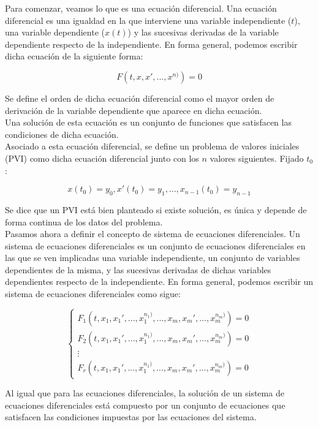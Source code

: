 \documentclass[12pt]{article}       %
\begin{document}
Para comenzar, veamos lo que es una ecuación diferencial. Una ecuación diferencial es una igualdad en la que interviene una variable independiente ($t$), una variable dependiente ($x(t)$) y las sucesivas derivadas de la variable dependiente respecto de la independiente. En forma general, podemos escribir dicha ecuación de la siguiente forma:

$$ F(t, x, x', ..., x^{n)}) = 0 $$

Se define el orden de dicha ecuación diferencial como el mayor orden de derivación de la variable dependiente que aparece en dicha ecuación.\\

Una solución de esta ecuación es un conjunto de funciones que satisfacen las condiciones de dicha ecuación.\\

Asociado a esta ecuación diferencial, se define un problema de valores iniciales (PVI) como dicha ecuación diferencial junto con los $n$ valores siguientes. Fijado $t_0$:

$$ x(t_0) = y_0, x'(t_0) = y_1, ..., x_{n-1}(t_0) = y_{n-1} $$

Se dice que un PVI está bien planteado si existe solución, es única y depende de forma continua de los datos del problema.\\

Pasamos ahora a definir el concepto de sistema de ecuaciones diferenciales. Un sistema de ecuaciones diferenciales es un conjunto de ecuaciones diferenciales en las que se ven implicadas una variable independiente, un conjunto de variables dependientes de la misma, y las sucesivas derivadas de dichas variables dependientes respecto de la independiente. En forma general, podemos escribir un sistema de ecuaciones diferenciales como sigue:

$$
\begin{cases}
F_1(t, x_1, x_1', ..., x_1^{n_1)}, ..., x_m, x_m', ..., x_m^{n_m)}) = 0 \\
F_2(t, x_1, x_1', ..., x_1^{n_1)}, ..., x_m, x_m', ..., x_m^{n_m)}) = 0 \\
\vdots \\
F_r(t, x_1, x_1', ..., x_1^{n_1)}, ..., x_m, x_m', ..., x_m^{n_m)}) = 0
\end{cases}
$$

Al igual que para las ecuaciones diferenciales, la solución de un sistema de ecuaciones diferenciales está compuesto por un conjunto de ecuaciones que satisfacen las condiciones impuestas por las ecuaciones del sistema.\\
\end{document}
